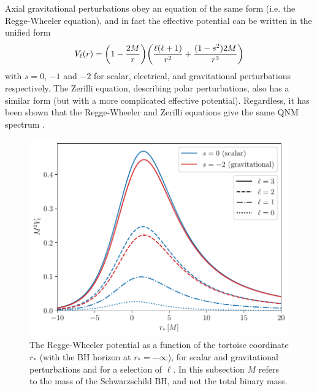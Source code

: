 Axial gravitational perturbations obey an equation of the same form (i.e. the Regge-Wheeler equation), and in fact the effective potential can be written in the unified form
\begin{equation}
    V_\ell(r) = \qty( 1 - \frac{2M}{r} ) \qty( \frac{\ell (\ell + 1)}{r^2} + \frac{(1 - s^2)2M}{r^3} )
\end{equation}
with $s = 0$, $-1$ and $-2$ for scalar, electrical, and gravitational perturbations respectively. 
The Zerilli equation, describing polar perturbations, also has a similar form (but with a more complicated effective potential). 
Regardless, it has been shown that the Regge-Wheeler and Zerilli equations give the same QNM spectrum \cite{Chandrasekhar:1975nkd}.

\begin{figure}[t]
    \centering
    \includegraphics[width=0.8\columnwidth]{Figures/Introduction/rw_potential.pdf}
    \caption[The Regge-Wheeler potential]{The Regge-Wheeler potential as a function of the tortoise coordinate $r_*$ (with the BH horizon at $r_* = -\infty$), for scalar and gravitational perturbations and for a selection of $\ell$. In this subsection $M$ refers to the mass of the Schwarzschild BH, and not the total binary mass.}
    \label{fig:rw_potential}
\end{figure}


